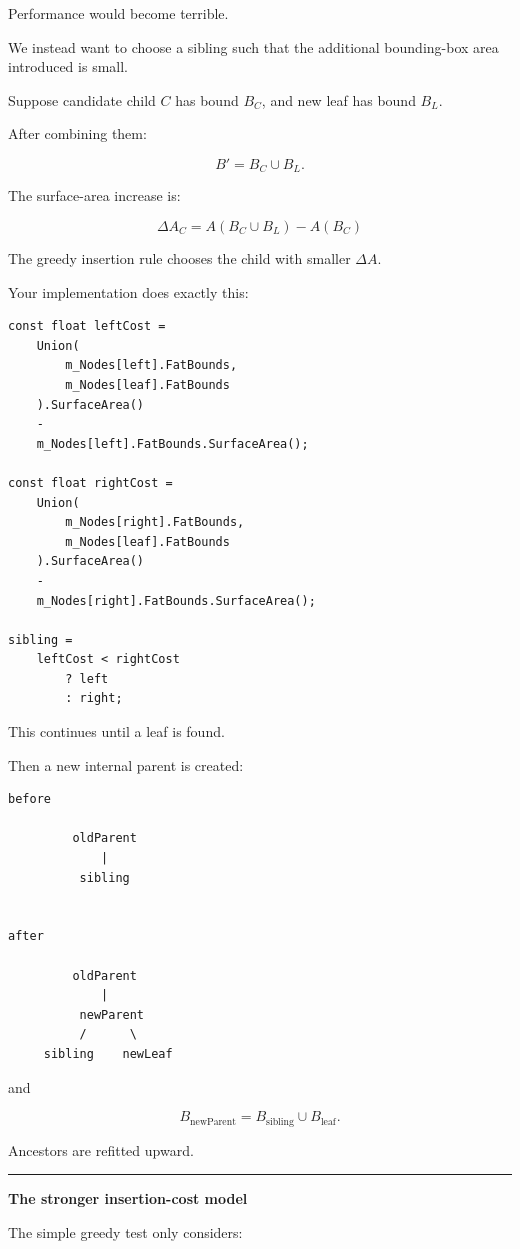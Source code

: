 Performance would become terrible.

We instead want to choose a sibling such that the additional bounding-box area introduced is small.

Suppose candidate child \(C\) has bound \(B_C\), and new leaf has bound \(B_L\).

After combining them:

\[
B'=
B_C\cup B_L.
\]

The surface-area increase is:

\[
\boxed{
\Delta A_C
=
A(B_C\cup B_L)-A(B_C)
}
\]

The greedy insertion rule chooses the child with smaller \(\Delta A\).

Your implementation does exactly this:

\begin{verbatim}
const float leftCost =
    Union(
        m_Nodes[left].FatBounds,
        m_Nodes[leaf].FatBounds
    ).SurfaceArea()
    -
    m_Nodes[left].FatBounds.SurfaceArea();

const float rightCost =
    Union(
        m_Nodes[right].FatBounds,
        m_Nodes[leaf].FatBounds
    ).SurfaceArea()
    -
    m_Nodes[right].FatBounds.SurfaceArea();

sibling =
    leftCost < rightCost
        ? left
        : right;
\end{verbatim}

This continues until a leaf is found.

Then a new internal parent is created:

\begin{verbatim}
before

         oldParent
             |
          sibling


after

         oldParent
             |
          newParent
          /      \
     sibling    newLeaf
\end{verbatim}

and

\[
B_{\text{newParent}}
=
B_{\text{sibling}}
\cup
B_{\text{leaf}}.
\]

Ancestors are refitted upward.

\begin{center}\rule{0.5\linewidth}{0.5pt}\end{center}

\textbf{The stronger insertion-cost model}

The simple greedy test only considers:

